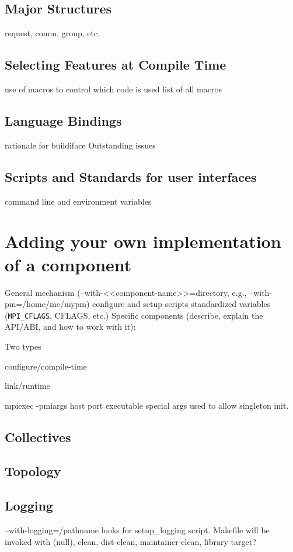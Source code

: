 \documentclass{report}
\begin{document}
\section{Major Structures}
      request, comm, group, etc.

\section{Selecting Features at Compile Time}
     use of macros to control which code is used
     list of all macros

\section{Language Bindings}
           rationale for buildiface
           Outstanding issues

\section{Scripts and Standards for user interfaces}
           command line and environment variables

\chapter{Adding your own implementation of a component}
         General mechanism (--with-<<component-name>>=directory, e.g., --with-pm=/home/me/mypm)
              configure and setup scripts
              standardized variables (\texttt{MPI\_CFLAGS}, CFLAGS, etc.)
         Specific components (describe, explain the API/ABI, and how to work with it):

Two types 

configure/compile-time

link/runtime

mpiexec 
    -pmiargs host port executable
special args used to allow singleton init.

\section{Collectives}
\section{Topology}
\section{Logging}
    --with-logging=/pathname
    looks for setup_logging script.  Makefile will be invoked with (null),
    clean, dist-clean, maintainer-clean, library target?
\end{document}
